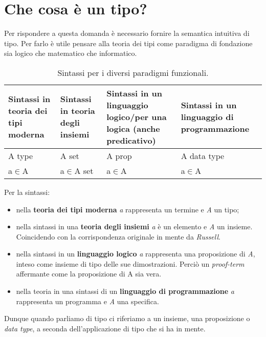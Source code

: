 \section{Che cosa \`e un tipo?}
\label{sec:cosa e un tipo}
Per rispondere a questa domanda \`e necessario fornire la semantica intuitiva di tipo. Per farlo \`e utile pensare alla teoria dei tipi come paradigma di fondazione sia logico che matematico che informatico.

\begin{table}[h]
\centering
\begin{tabularx}{\textwidth}{XXXX}
\hline 
\rowcolor{orange}
{\color[HTML]{FFFFFF}\textbf{Sintassi in teoria dei tipi moderna}} & {\color[HTML]{FFFFFF}\textbf{Sintassi in teoria degli insiemi}} & {\color[HTML]{FFFFFF} \textbf{Sintassi in un linguaggio logico/per una logica (anche predicativo)}} & {\color[HTML]{FFFFFF}\textbf{Sintassi in un linguaggio di programmazione}} \\
\hline\hline 
A type & A set & A prop & A data type \\ 
\hline 
a$\in$A & a$\in$A set & a$\in$A & a$\in$A \\ 
\hline 
\end{tabularx}
\caption{\label{tab:sintassi-paradigmi-funzionali}Sintassi per i diversi paradigmi funzionali.} 
\end{table}
\noindent
Per la sintassi:
\begin{itemize} 
\item nella \textbf{teoria dei tipi moderna} \textit{a} rappresenta un termine e \textit{A} un tipo;
\item nella sintassi in una \textbf{teoria degli insiemi} \textit{a} \`e un elemento e \textit{A} un insieme. Coincidendo con la corrispondenza originale in mente da \textit{Russell}.
\item nella sintassi in un \textbf{linguaggio logico} \textit{a} rappresenta una proposizione di \textit{A}, inteso come insieme di tipo delle sue dimostrazioni. Perci\`o un \textit{proof-term} affermante come la proposizione di A sia vera.
\item nella teoria in una sintassi di un \textbf{linguaggio di programmazione} \textit{a} rappresenta un programma e \textit{A} una specifica.
\end{itemize}
\noindent
Dunque quando parliamo di tipo ci riferiamo a un insieme, una proposizione o \textit{data type}, a seconda dell'applicazione di tipo che si ha in mente.\\\\
